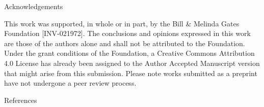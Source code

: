 \documentclass[
  12pt]{article}
\begin{document}
Acknowledgements

This work was supported, in whole or in part, by the Bill \& Melinda
Gates Foundation {[}INV-021972{]}. The conclusions and opinions
expressed in this work are those of the authors alone and shall not be
attributed to the Foundation. Under the grant conditions of the
Foundation, a Creative Commons Attribution 4.0 License has already been
assigned to the Author Accepted Manuscript version that might arise from
this submission. Please note works submitted as a preprint have not
undergone a peer review process.

References


  
\end{document}
